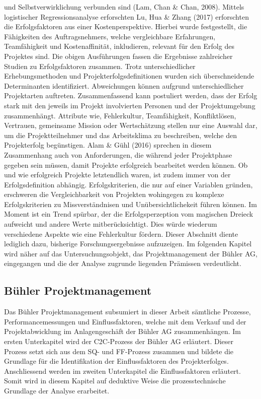 und Selbstverwirklichung verbunden sind (Lam, Chan \& Chan, 2008). Mittels logistischer Regressionsanalyse erforschten Lu, Hua \& Zhang (2017) erforschten die Erfolgsfaktoren aus einer Kostenperspektive. Hierbei wurde festgestellt, die Fähigkeiten des Auftragsnehmers, welche vergleichbare Erfahrungen, Teamfähigkeit und Kostenaffinität, inkludieren, relevant für den Erfolg des Projektes sind. Die obigen Ausführungen fassen die Ergebnisse zahlreicher Studien zu Erfolgsfaktoren zusammen. Trotz unterschiedlicher Erhebungsmethoden und Projekterfolgsdefinitionen wurden sich überschneidende Determinanten identifiziert. Abweichungen können aufgrund unterschiedlicher Projektarten auftreten. Zusammenfassend kann postuliert werden, dass der Erfolg stark mit den jeweils im Projekt involvierten Personen und der Projektumgebung zusammenhängt. Attribute wie, Fehlerkultur, Teamfähigkeit, Konfliktlösen, Vertrauen, gemeinsame Mission oder Wertschätzung stellen nur eine Auswahl dar, um die Projektteilnehmer und das Arbeitsklima zu beschreiben, welche den Projekterfolg begünstigen. Alam \& Gühl (2016) sprechen in diesem Zusammenhang auch von Anforderungen, die während jeder Projektphase gegeben sein müssen, damit Projekte erfolgreich bearbeitet werden können. Ob und wie erfolgreich Projekte letztendlich waren, ist zudem immer von der Erfolgsdefinition abhängig. Erfolgskriterien, die nur auf einer Variablen gründen, erschweren die Vergleichbarkeit von Projekten wohingegen zu komplexe Erfolgskriterien zu Missverständnisen und Unübersichtlichekeit führen können. Im Moment ist ein Trend spürbar, der die Erfolgsperzeption vom magischen Dreieck aufweicht und andere Werte mitberücksichtigt. Dies würde wiederum verschiedene Aspekte wie eine Fehlerkultur fördern. Dieser Abschnitt diente lediglich dazu, bisherige Forschungsergebnisse aufzuzeigen. Im folgenden Kapitel wird näher auf das Untersuchungsobjekt, das Projektmanagement der Bühler AG, eingegangen und die der Analyse zugrunde liegenden Prämissen verdeutlicht. 
	
\subsection{Bühler Projektmanagement}
Das Bühler Projektmanagement subsumiert in dieser Arbeit sämtliche Prozesse, Performancemessungen und Einflussfaktoren, welche mit dem Verkauf und der Projektabwicklung im Anlagengeschäft der Bühler AG zusammenhängen. Im ersten Unterkapitel wird der C2C-Prozess der Bühler AG erläutert. Dieser Prozess setzt sich aus dem SQ- und FF-Prozess zusammen und bildete die Grundlage für die Identifikation der Einflussfaktoren des Projekterfolges. Anschliessend werden im zweiten Unterkapitel die Einflussfaktoren erläutert. Somit wird in diesem Kapitel auf deduktive Weise die prozesstechnische Grundlage der Analyse erarbeitet.

